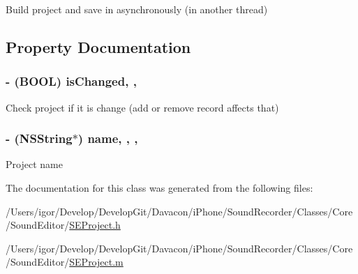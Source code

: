 Build project and save in asynchronously (in another thread) 

\subsection{Property Documentation}
\hypertarget{interface_s_e_project_a4da84c0c1ef729881956646b15762cc9}{
\subsubsection[{is\-Changed}]{\setlength{\rightskip}{0pt plus 5cm}-\/ (B\-O\-O\-L) is\-Changed\hspace{0.3cm}{\ttfamily [read]}, {\ttfamily [nonatomic]}, {\ttfamily [assign]}}}\label{interface_s_e_project_a4da84c0c1ef729881956646b15762cc9}
Check project if it is change (add or remove record affects that) \hypertarget{interface_s_e_project_adf05552fc2cf324eb3511d3bd1b8a996}{
\subsubsection[{name}]{\setlength{\rightskip}{0pt plus 5cm}-\/ (N\-S\-String$\ast$) name\hspace{0.3cm}{\ttfamily [read]}, {\ttfamily [write]}, {\ttfamily [nonatomic]}, {\ttfamily [strong]}}}\label{interface_s_e_project_adf05552fc2cf324eb3511d3bd1b8a996}
Project name 

The documentation for this class was generated from the following files\-:\begin{DoxyCompactItemize}
\item 
/\-Users/igor/\-Develop/\-Develop\-Git/\-Davacon/i\-Phone/\-Sound\-Recorder/\-Classes/\-Core/\-Sound\-Editor/\hyperlink{_s_e_project_8h}{S\-E\-Project.\-h}\item 
/\-Users/igor/\-Develop/\-Develop\-Git/\-Davacon/i\-Phone/\-Sound\-Recorder/\-Classes/\-Core/\-Sound\-Editor/\hyperlink{_s_e_project_8m}{S\-E\-Project.\-m}\end{DoxyCompactItemize}
